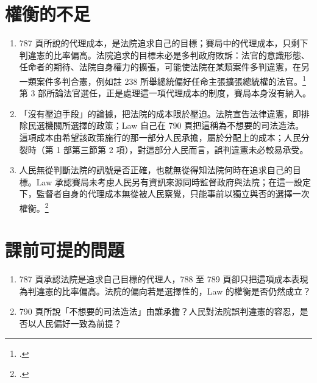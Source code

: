 \section{權衡的不足}
\label{sec:70_independence-3}

\begin{enumerate}
\tightlist
\item
  787 頁所說的代理成本，是法院追求自己的目標；賽局中的代理成本，只剩下判違憲的比率偏高。法院追求的目標未必是多判政府敗訴：法官的意識形態、任命者的期待、法院自身權力的擴張，可能使法院在某類案件多判違憲，在另一類案件多判合憲，例如註 238 所舉總統偏好任命主張擴張總統權的法官。\footcite[798 n.238]{law2009}第 3 部所論法官選任，正是處理這一項代理成本的制度，賽局本身沒有納入。
\item
  「沒有壓迫手段」的論據，把法院的成本限於壓迫。法院宣告法律違憲，即排除民選機關所選擇的政策；Law 自己在 790 頁把這稱為不想要的司法造法。這項成本由希望該政策施行的那一部分人民承擔，屬於分配上的成本；人民分裂時（第 1 部第三節第 2 項），對這部分人民而言，誤判違憲未必較易承受。
\item
  人民無從判斷法院的訊號是否正確，也就無從得知法院何時在追求自己的目標。Law 承認賽局未考慮人民另有資訊來源同時監督政府與法院；在這一設定下，監督者自身的代理成本無從被人民察覺，只能事前以獨立與否的選擇一次權衡。\footcite[788, 790]{law2009}
\end{enumerate}

\section{課前可提的問題}
\label{sec:70_independence-4}

\begin{enumerate}
\tightlist
\item 787 頁承認法院是追求自己目標的代理人，788 至 789 頁卻只把這項成本表現為判違憲的比率偏高。法院的偏向若是選擇性的，Law 的權衡是否仍然成立？
\item 790 頁所說「不想要的司法造法」由誰承擔？人民對法院誤判違憲的容忍，是否以人民偏好一致為前提？
\end{enumerate}
